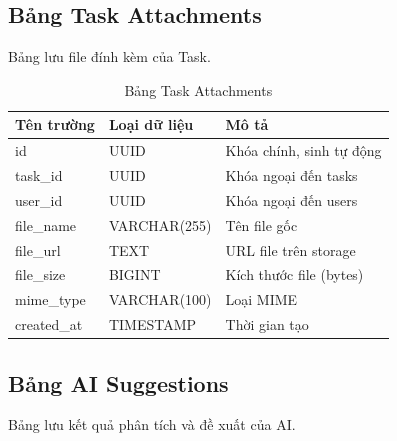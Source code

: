 \documentclass[12pt,a4paper]{report}
\begin{document}
\subsection{Bảng Task Attachments}

Bảng lưu file đính kèm của Task.

\begin{table}[H]
\centering
\caption{Bảng Task Attachments}
\begin{tabular}{|p{4cm}|p{4cm}|p{7cm}|}
\hline
\textbf{Tên trường} & \textbf{Loại dữ liệu} & \textbf{Mô tả} \\
\hline
id & UUID & Khóa chính, sinh tự động \\
\hline
task\_id & UUID & Khóa ngoại đến tasks \\
\hline
user\_id & UUID & Khóa ngoại đến users \\
\hline
file\_name & VARCHAR(255) & Tên file gốc \\
\hline
file\_url & TEXT & URL file trên storage \\
\hline
file\_size & BIGINT & Kích thước file (bytes) \\
\hline
mime\_type & VARCHAR(100) & Loại MIME \\
\hline
created\_at & TIMESTAMP & Thời gian tạo \\
\hline
\end{tabular}
\label{tab:task_attachments_table}
\end{table}


\subsection{Bảng AI Suggestions}

Bảng lưu kết quả phân tích và đề xuất của AI.
\end{document}
